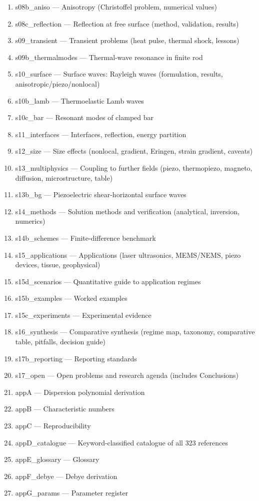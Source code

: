 \documentclass[12pt,a4paper]{article}
\begin{document}
\begin{enumerate}[nosep,leftmargin=1.6em]
\item s08b\_aniso --- Anisotropy (Christoffel problem, numerical values)
\item s08c\_reflection --- Reflection at free surface (method, validation, results)
\item s09\_transient --- Transient problems (heat pulse, thermal shock, lessons)
\item s09b\_thermalmodes --- Thermal-wave resonance in finite rod
\item s10\_surface --- Surface waves: Rayleigh waves (formulation, results, anisotropic/piezo/nonlocal)
\item s10b\_lamb --- Thermoelastic Lamb waves
\item s10c\_bar --- Resonant modes of clamped bar
\item s11\_interfaces --- Interfaces, reflection, energy partition
\item s12\_size --- Size effects (nonlocal, gradient, Eringen, strain gradient, caveats)
\item s13\_multiphysics --- Coupling to further fields (piezo, thermopiezo, magneto, diffusion, microstructure, table)
\item s13b\_bg --- Piezoelectric shear-horizontal surface waves
\item s14\_methods --- Solution methods and verification (analytical, inversion, numerics)
\item s14b\_schemes --- Finite-difference benchmark
\item s15\_applications --- Applications (laser ultrasonics, MEMS/NEMS, piezo devices, tissue, geophysical)
\item s15d\_scenarios --- Quantitative guide to application regimes
\item s15b\_examples --- Worked examples
\item s15c\_experiments --- Experimental evidence
\item s16\_synthesis --- Comparative synthesis (regime map, taxonomy, comparative table, pitfalls, decision guide)
\item s17b\_reporting --- Reporting standards
\item s17\_open --- Open problems and research agenda (includes Conclusions)
\item appA --- Dispersion polynomial derivation
\item appB --- Characteristic numbers
\item appC --- Reproducibility
\item appD\_catalogue --- Keyword-classified catalogue of all 323 references
\item appE\_glossary --- Glossary
\item appF\_debye --- Debye derivation
\item appG\_params --- Parameter register
\end{enumerate}
\end{document}
